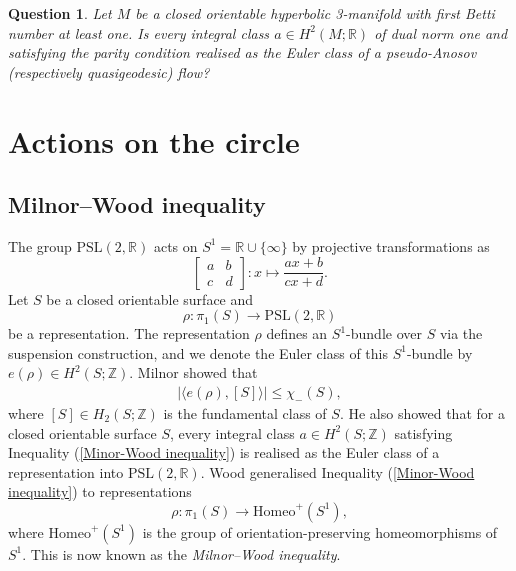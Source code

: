 \documentclass[11pt]{amsart}
\newtheorem{question}[thm]{Question}
\theoremstyle{remark}
\theoremstyle{definition}
\begin{document}
	\begin{question}
		Let $M$ be a closed orientable hyperbolic 3-manifold with first Betti number at least one. Is every integral class $a \in H^2(M ; \mathbb{R})$ of dual norm one and satisfying the parity condition realised as the Euler class of a pseudo-Anosov (respectively quasigeodesic) flow?
		\label{que:euler class one for tight contact structures}
	\end{question}
	
	
	
	\section{Actions on the circle}
	
	\label{sec: actions on cricle}
	
	\subsection{Milnor--Wood inequality}
	
	The group $\mathrm{PSL}(2, \mathbb{R})$ acts on $S^1 = \mathbb{R} \cup \{ \infty \}$ by projective transformations as 
	\[ \begin{bmatrix}
		a & b \\
		c & d
	\end{bmatrix} \colon  x  \longmapsto \frac{ax+ b}{cx+d}. \] Let $S$ be a closed orientable surface and
	\[ \rho \colon \pi_1(S) \rightarrow \mathrm{PSL}(2, \mathbb{R}) \]
	be a representation. The representation $\rho$ defines an $S^1$-bundle over $S$ via the suspension construction, and we denote the Euler class of this $S^1$-bundle by $e(\rho) \in H^2(S ; \mathbb{Z})$. Milnor \cite{milnor1958existence} showed that 
	\begin{eqnarray}
		|\langle e(\rho) , [S] \rangle | \leq \chi_-(S),
		\label{Minor-Wood inequality}
	\end{eqnarray}
	where $[S] \in H_2(S ; \mathbb{Z})$ is the fundamental class of $S$. He also showed that for a closed orientable surface $S$, every integral class $a \in H^2(S ; \mathbb{Z})$ satisfying Inequality (\ref{Minor-Wood inequality}) is realised as the Euler class of a representation into $\mathrm{PSL}(2, \mathbb{R})$.  Wood \cite{wood1971bundles} generalised Inequality (\ref{Minor-Wood inequality}) to representations 
	\[ \rho \colon \pi_1(S) \rightarrow \mathrm{Homeo}^+(S^1), \]
	where $\mathrm{Homeo}^+(S^1)$ is the group of orientation-preserving homeomorphisms of $S^1$. This is now known as the \emph{Milnor--Wood inequality}. 
	
\end{document}
